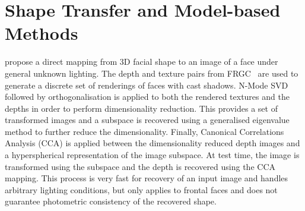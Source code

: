 \section{Shape Transfer and Model-based Methods}\label{ch:bg_model_based}
\citet{minsik2013robust} propose a direct mapping from 3D facial shape to an
image of a face under general unknown lighting. The depth and texture pairs from
FRGC~\cite{phillips2005overview} are used to generate a discrete set of
renderings of faces with cast shadows. N-Mode
SVD~\cite{vasilescu2003multilinear} followed by orthogonalisation is applied to
both the rendered textures and the depths in order to perform dimensionality
reduction. This provides a set of transformed images and a subspace is recovered
using a generalised eigenvalue method to further reduce the dimensionality.
Finally, Canonical Correlations Analysis (CCA) is applied between the
dimensionality reduced depth images and a hyperspherical representation of the
image subspace. At test time, the image is transformed using the subspace and
the depth is recovered using the CCA mapping. This process is very fast for
recovery of an input image and handles arbitrary lighting conditions, but
only applies to frontal faces and does not guarantee photometric consistency
of the recovered shape.

